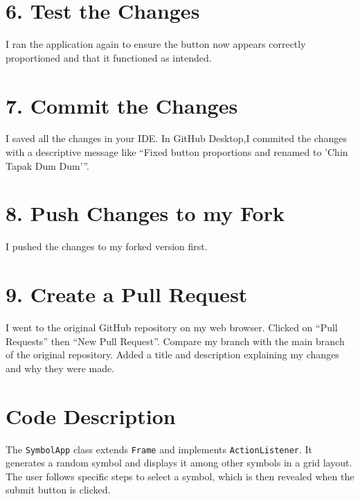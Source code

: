 \documentclass[12pt, a4paper]{article}
\begin{document}
\section*{ 6. Test the Changes}
I ran the application again to ensure the button now appears correctly proportioned and that it functioned as intended.

\section*{ 7. Commit the Changes}
I saved all the changes in your IDE.
In GitHub Desktop,I commited the changes with a descriptive message like “Fixed button proportions and renamed to 'Chin Tapak Dum Dum'”.

\section*{ 8. Push Changes to my Fork}
I pushed the changes to my forked version first.

\section*{9. Create a Pull Request}
I went to the original GitHub repository on my web browser.
Clicked on “Pull Requests” then “New Pull Request”.
Compare my branch with the main branch of the original repository.
Added a title and description explaining my changes and why they were made.


\section*{Code Description}
The \texttt{SymbolApp} class extends \texttt{Frame} and implements \texttt{ActionListener}. It generates a random symbol and displays it among other symbols in a grid layout. The user follows specific steps to select a symbol, which is then revealed when the submit button is clicked.
\end{document}
